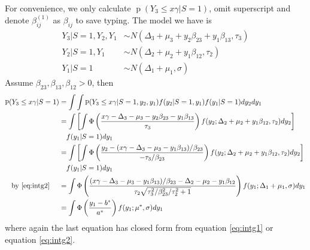 \documentclass[12pt]{article}
\DeclareMathOperator{\pr}{p}
\begin{document}
\begin{enumerate}
  For convenience, we only calculate $\pr (Y_3 \leq x\gamma | S= 1)$, omit
  superscript and denote $\beta_{ij}^{(1)} $ as $\beta_{ij}$ to save
  typing.  The model we have is
  \begin{align*}
    Y_3 | S= 1 , Y_2, Y_1 & \sim N(\Delta_3 + \mu_3 + y_2\beta_{23} + y_1\beta_{13}, \tau_3) \\
    Y_2 | S = 1, Y_{1}  & \sim N(\Delta_2 + \mu_2 + y_1\beta_{12}, \tau_2)                \\
    Y_1 | S= 1 & \sim N(\Delta_1 + \mu_1, \sigma)
  \end{align*}
  Assume $\beta_{23}, \beta_{13}, \beta_{12} > 0 $, then
  \begin{align*}
    \pr (Y_3 \leq x\gamma |S = 1) & = \int \int \pr (Y_3 \leq x\gamma|S = 1, y_2, y_1) f(y_2|S=1, y_1) f(y_1|S=1) dy_2dy_1\\
    & = \int \left[ \int \Phi \left( \frac{x\gamma - \Delta_3 - \mu_3 - y_2\beta_{23}- y_1\beta_{13}}{\tau_3} \right) f(y_2; \Delta_2+\mu_2+y_1\beta_{12}, \tau_2)dy_2 \right]\\
    & \quad f(y_1|S=1) dy_1\\
    & = \int \left[ \int \Phi \left( \frac{y_2 - (x\gamma - \Delta_3 - \mu_3 - y_1\beta_{13})/\beta_{23}}{-\tau_3/\beta_{23}} \right) f(y_2; \Delta_2+\mu_2+y_1\beta_{12}, \tau_2)dy_2 \right] \\
    & \quad f(y_1|S=1) dy_1\\
    \text{by \eqref{eq:intg2} } \quad & = \int \Phi \left( \frac{(x\gamma - \Delta_3 - \mu_3 - y_1\beta_{13})/\beta_{23} - \Delta_2 - \mu_2 - y_1\beta_{12}}{\tau_2 \sqrt{\tau_3^2/\beta_{23}^2/\tau_2^2 + 1}} \right)f(y_1; \Delta_1+ \mu_1, \sigma) dy_1\\
    & = \int \Phi \left( \frac{y_1 - b^{*}}{a^{*}} \right) f(y_1; \mu^{*}, \sigma)
    dy_1
  \end{align*}
  where again the last equation has closed form from equation
  \eqref{eq:intg1} or equation \eqref{eq:intg2}.
\end{enumerate}
\end{document}
